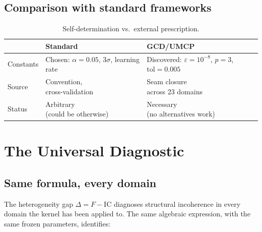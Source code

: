 \documentclass[
  aps,
  prd,
  twocolumn,
  superscriptaddress,
  nofootinbib,
  floatfix
]{revtex4-2}
\newcommand{\eps}{\varepsilon}
\newcommand{\IC}{\mathrm{IC}}
\begin{document}
\subsection{Comparison with standard frameworks}

\begin{table}[t]
\caption{\label{tab:self-determination}Self-determination
vs.\ external prescription.}
\begin{ruledtabular}
\begin{tabular}{lll}
 & Standard & GCD/UMCP \\
\midrule
Constants &
  \parbox[t]{2.4cm}{Chosen: $\alpha{=}0.05$,\\$3\sigma$, learning rate} &
  \parbox[t]{2.4cm}{Discovered:\\$\eps{=}10^{-8}$, $p{=}3$,\\$\mathrm{tol}{=}0.005$} \\[10pt]
Source &
  \parbox[t]{2.4cm}{Convention,\\cross-validation} &
  \parbox[t]{2.4cm}{Seam closure\\across 23 domains} \\[8pt]
Status &
  \parbox[t]{2.4cm}{Arbitrary\\(could be otherwise)} &
  \parbox[t]{2.4cm}{Necessary\\(no alternatives work)}
\end{tabular}
\end{ruledtabular}
\end{table}

\section{The Universal Diagnostic}\label{sec:universal-diagnostic}

\subsection{Same formula, every domain}

The heterogeneity gap $\Delta = F - \IC$ diagnoses structural
incoherence in every domain the kernel has been applied to.  The
same algebraic expression, with the same frozen parameters, identifies:
\end{document}
